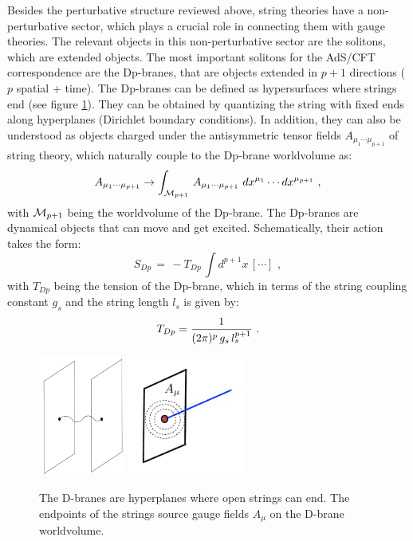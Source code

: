 \documentclass[12pt,notitlepage,a4paper]{article}
\newcommand{\beq}{\begin{equation}}
\newcommand{\eeq}{\end{equation}}
\begin{document}
Besides the perturbative structure reviewed above, string theories have  a non-perturbative sector, which plays a crucial role in connecting them with gauge theories. The  relevant objects  in this non-perturbative sector are the solitons, which  are extended objects. The most important solitons for the AdS/CFT correspondence   are the  Dp-branes, that are objects extended in $p+1$ directions  ($p$ spatial + time). The Dp-branes can be defined as hypersurfaces where strings end (see figure \ref{Dbranes}). They can be obtained by quantizing the string with fixed ends along hyperplanes (Dirichlet boundary conditions). In addition, they can also be understood as objects charged under the antisymmetric tensor fields $A_{\mu_1\cdots\mu_{p+1}}$ of string theory, which naturally couple to the Dp-brane worldvolume as:
\beq
A_{\mu_1\cdots\mu_{p+1}}\to
\int_{{\cal M}_{p+1}}\,A_{\mu_1\cdots\mu_{p+1}}\,\, dx^{\mu_1}\cdots  dx^{\mu_{p+1}}\,\,,
\eeq
with ${\cal M}_{p+1}$  being the worldvolume of the Dp-brane. The Dp-branes are dynamical objects
that can move and get excited. Schematically, their action takes the form:
\beq
S_{Dp}\,=\,-T_{Dp}\,\int d^{p+1} x\,[\cdots]\,\,,
\eeq
with $T_{Dp}$ being the tension of the Dp-brane, which in terms of the string coupling constant $g_s$ and the  string  length $l_s$ is given by:
\beq
T_{Dp}={1\over (2\pi)^p \,g_s \, l_s^{p+1}}\,\,.
\label{TDp}
\eeq
\begin{figure}[ht]
\center
\includegraphics[width=0.25\textwidth]{Dbranes.pdf}
\qquad\qquad\qquad
\includegraphics[width=0.35\textwidth]{gauge_source.pdf}
\caption{The D-branes are hyperplanes where open strings can end. The endpoints of the strings source gauge fields $A_{\mu}$ on the D-brane worldvolume.} 
\label{Dbranes}
\end{figure}
\end{document}
